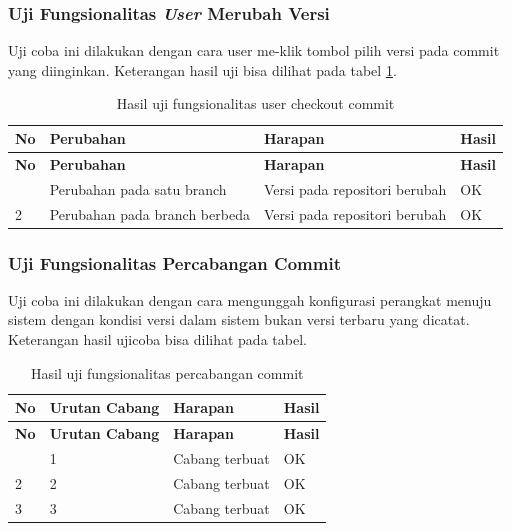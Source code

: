 	\subsubsection{Uji Fungsionalitas \textit{User} Merubah Versi}
	Uji coba ini dilakukan dengan cara user me-klik tombol pilih versi pada commit yang diinginkan. Keterangan hasil uji bisa dilihat pada tabel \ref{hasilCheckoutCommit}.
	\begin{longtable}{|p{}|p{}|p{}|p{}|}
		
		\caption{Hasil uji fungsionalitas user checkout commit} \label{hasilCheckoutCommit} \\
		\hline
		\textbf{No} & \textbf{Perubahan} & \textbf{Harapan} & \textbf{Hasil} \\ \hline
		\endfirsthead
		\hline
		\textbf{No} & \textbf{Perubahan} & \textbf{Harapan} & \textbf{Hasil} \\ \hline
		\endhead
		\endfoot
		\endlastfoot
		1 & Perubahan pada satu branch & Versi pada repositori berubah & OK\\ \hline
		2 & Perubahan pada branch berbeda & Versi pada repositori berubah & OK\\ \hline
		
	\end{longtable}

	
	
	\subsubsection{Uji Fungsionalitas Percabangan Commit}
	Uji coba ini dilakukan dengan cara mengunggah konfigurasi perangkat menuju sistem dengan kondisi versi dalam sistem bukan versi terbaru yang dicatat. Keterangan hasil ujicoba bisa dilihat pada tabel.
	
	\begin{longtable}{|p{}|p{}|p{}|p{}|}
		
		\caption{Hasil uji fungsionalitas percabangan commit} \label{hasil precabangan commit} \\
		\hline
		\textbf{No} & \textbf{Urutan Cabang} & \textbf{Harapan} & \textbf{Hasil} \\ \hline
		\endfirsthead
		\hline
		\textbf{No} & \textbf{Urutan Cabang} & \textbf{Harapan} & \textbf{Hasil} \\ \hline
		\endhead
		\endfoot
		\endlastfoot
		1 & 1 & Cabang terbuat & OK\\ \hline
		2 & 2 & Cabang terbuat & OK\\ \hline
		3 & 3 & Cabang terbuat & OK\\ \hline
	\end{longtable}
	
